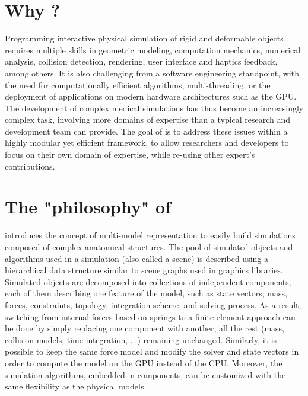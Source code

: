 
\section{Why \sofa ?}
Programming interactive physical simulation of rigid and deformable objects requires multiple skills in geometric modeling, computation mechanics, numerical analysis, collision detection, rendering, user interface and haptics feedback, among others. 
It is also challenging from a software engineering standpoint, with the need for computationally efficient algorithms, multi-threading, or the deployment of applications on modern hardware architectures such as the GPU.
The development of complex medical simulations has thus become an increasingly complex task, involving more domains of expertise than a typical research and development team can provide.
The goal of \sofa{} is to address these issues within a highly modular yet efficient framework, to allow researchers and developers to focus on their own domain of expertise, while re-using other expert's contributions. 

\section{The "philosophy" of \sofa}
\sofa{} introduces the concept of multi-model representation to easily build simulations composed of complex anatomical structures.
The pool of simulated objects and algorithms used in a simulation (also called a scene) is described using a hierarchical data structure similar to scene graphs used in graphics libraries. 
Simulated objects are decomposed into collections of independent components, each of them describing one feature of the model, such as state vectors, mass, forces, constraints, topology, integration scheme, and solving process.
As a result, switching from internal forces based on springs to a finite element approach can be done by simply replacing one component with another, all the rest (mass, collision models, time integration, ...) remaining unchanged. Similarly, it is possible to keep the same force model and modify the solver and state vectors in order to compute the model on the GPU instead of the CPU.
 Moreover, the simulation algorithms, embedded in components, can be customized with the same flexibility as the physical models.

